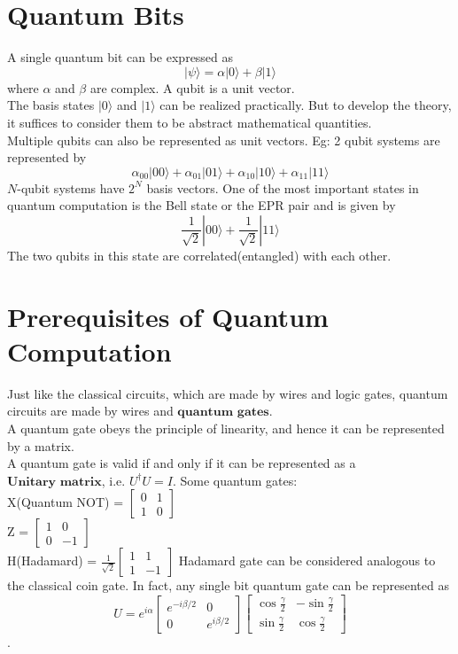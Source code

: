 \documentclass{article}
\begin{document}
\section{Quantum Bits}

A single quantum bit can be expressed as $$|\psi \rangle = \alpha |0 \rangle + \beta |1 \rangle$$ where $\alpha$ and $\beta$ are complex. A qubit is a unit vector.\\[3pt]
The basis states $|0 \rangle$ and $|1 \rangle$ can be realized practically. But to develop the theory, it suffices to consider them to be abstract mathematical quantities. \\[3pt]
Multiple qubits can also be represented as unit vectors. Eg: 2 qubit systems are represented by $$\alpha _{00} |00 \rangle + \alpha _{01} |01 \rangle + \alpha _{10} |10 \rangle + \alpha _{11} |11 \rangle$$ $N$-qubit systems have $2^N$ basis vectors.
One of the most important states in quantum computation is the Bell state or the EPR pair and is given by $$\frac{1}{\sqrt{2}} |00 \rangle + \frac{1}{\sqrt{2}} |11 \rangle$$ The two qubits in this state are correlated(entangled) with each other.

\section{Prerequisites of Quantum Computation}

Just like the classical circuits, which are made by wires and logic gates, quantum circuits are made by wires and $\textbf{quantum gates}$. \\[3pt]
A quantum gate obeys the principle of linearity, and hence it can be represented by a matrix. \\[3pt]
A quantum gate is valid if and only if it can be represented as a $\textbf{Unitary matrix}$, i.e. $U^{\dagger}U = I$. Some quantum gates:\\[5pt]
X(Quantum NOT) = $\begin{bmatrix} 
    0 & 1 \\
    1 & 0
    \end{bmatrix}$\\[3pt]
Z = $\begin{bmatrix}
    1 & 0 \\
    0 & -1
    \end{bmatrix}$\\[3pt]
H(Hadamard) = $\displaystyle{\frac{1}{\sqrt{2}}
    \begin{bmatrix}
    1 & 1 \\
    1 & -1
    \end{bmatrix}}$
Hadamard gate can be considered analogous to the classical coin gate. In fact, any single bit quantum gate can be represented as 
$$U = e^{i\alpha}\begin{bmatrix}
e^{-i\beta /2} & 0 \\
0 & e^{i\beta /2}
\end{bmatrix}
\begin{bmatrix}
\cos{\frac{\gamma}{2}}  & -\sin{\frac{\gamma}{2}} \\
\sin{\frac{\gamma}{2}} & \cos{\frac{\gamma}{2}}
\end{bmatrix}$$. 
\end{document}
